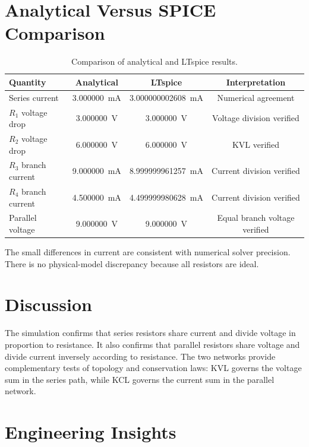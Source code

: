 \documentclass[11pt,a4paper]{article}
\begin{document}
\section{Analytical Versus SPICE Comparison}

\begin{table}[htbp]
\centering
\caption{Comparison of analytical and LTspice results.}
\begin{tabular}{lccc}
\toprule
Quantity & Analytical & LTspice & Interpretation \\
\midrule
Series current & \SI{3.000000}{\milli\ampere} & \SI{3.000000002608}{\milli\ampere} & Numerical agreement \\
$R_1$ voltage drop & \SI{3.000000}{\volt} & \SI{3.000000}{\volt} & Voltage division verified \\
$R_2$ voltage drop & \SI{6.000000}{\volt} & \SI{6.000000}{\volt} & KVL verified \\
$R_3$ branch current & \SI{9.000000}{\milli\ampere} & \SI{8.999999961257}{\milli\ampere} & Current division verified \\
$R_4$ branch current & \SI{4.500000}{\milli\ampere} & \SI{4.499999980628}{\milli\ampere} & Current division verified \\
Parallel voltage & \SI{9.000000}{\volt} & \SI{9.000000}{\volt} & Equal branch voltage verified \\
\bottomrule
\end{tabular}
\end{table}

The small differences in current are consistent with numerical solver precision. There is no physical-model discrepancy because all resistors are ideal.

\section{Discussion}

The simulation confirms that series resistors share current and divide voltage in proportion to resistance. It also confirms that parallel resistors share voltage and divide current inversely according to resistance. The two networks provide complementary tests of topology and conservation laws: KVL governs the voltage sum in the series path, while KCL governs the current sum in the parallel network.

\section{Engineering Insights}
\end{document}
